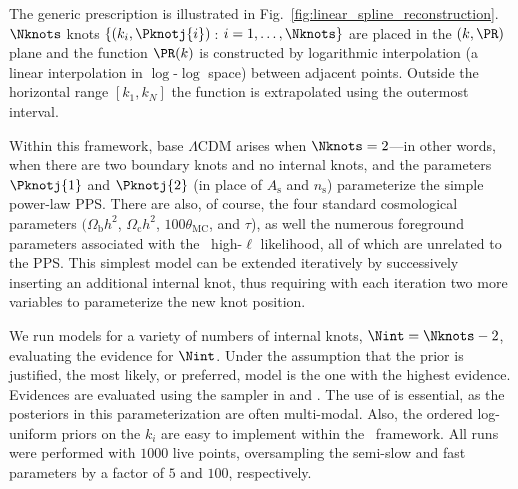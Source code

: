 The generic prescription is illustrated in Fig.~\ref{fig:linear_spline_reconstruction}. \(\Nknots\) knots \(\{(k_i,\Pknotj{i})\,\): \(i=1,\ldots,\Nknots\}\) are placed in the \((k,\PR)\) plane and the function \(\PR(k)\) is constructed by logarithmic interpolation (a linear interpolation in \(\log\)-\(\log\) space) between adjacent points.  Outside the horizontal range \([k_1,k_N]\) the function is extrapolated using the outermost interval.

Within this framework, base \(\Lambda\)CDM arises when \({\Nknots=2}\)---in other words, when there are two boundary knots and no internal knots, and the parameters \(\Pknotj{1}\) and \(\Pknotj{2}\) (in place of \(A_\mathrm{s}\) and \(n_\mathrm{s}\)) parameterize the simple power-law PPS\@. There are also, of course, the four standard cosmological parameters \((\Omega_{\mathrm{b}} h^2\), \(\Omega_{\mathrm{c}} h^2\), \(100\theta_{\mathrm{MC}}\), and \(\tau\)), as well the numerous foreground parameters associated with the \Planck\ high-\(\ell\) likelihood, all of which are unrelated to the PPS\@.  This simplest model can be extended iteratively by successively inserting an additional internal knot, thus requiring with each iteration two more variables to parameterize the new knot position.


\begin{table}[tp]
  \centering
  
  \caption{%
    Prior for moveable knot positions.  The \(\PR\) positions are distributed in a log-uniform manner across a wide range.  The \(k\) positions are also log-uniformly distributed across the entire range needed by \CosmoMC{} and are sorted so that \({k_1<\cdots<k_{\Nknots}}\).  When we marginalize over the number of knots, \(\Nknots\), we assume a uniform prior between 2 and 10. }\label{tab:P_k_priors} 
\end{table}

We run models for a variety of numbers of internal knots, \(\Nint =\Nknots -2\), evaluating the evidence for \(\Nint\).  Under the assumption that the prior is justified, the most likely, or preferred, model is the one with the highest evidence.  Evidences are evaluated using the \PolyChord{} sampler \citep{polychordletter,polychordpaper} in \CAMB{} and \CosmoMC{}. The use of \PolyChord{} is essential, as the posteriors in this parameterization are often multi-modal. Also, the ordered log-uniform priors on the \(k_i\) are easy to implement within the \PolyChord\ framework. All runs were performed with \(1000\) live points, oversampling the semi-slow and fast parameters by a factor of \(5\) and \(100\), respectively.

